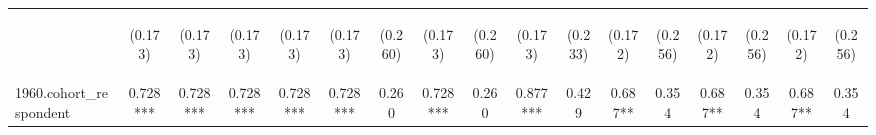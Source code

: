 \begin{center}
\begin{tabular}{lcccccccccccccccc}
\vspace{4pt} & \begin{footnotesize}(0.173)\end{footnotesize} & \begin{footnotesize}(0.173)\end{footnotesize} & \begin{footnotesize}(0.173)\end{footnotesize} & \begin{footnotesize}(0.173)\end{footnotesize} & \begin{footnotesize}(0.173)\end{footnotesize} & \begin{footnotesize}(0.260)\end{footnotesize} & \begin{footnotesize}(0.173)\end{footnotesize} & \begin{footnotesize}(0.260)\end{footnotesize} & \begin{footnotesize}(0.173)\end{footnotesize} & \begin{footnotesize}(0.233)\end{footnotesize} & \begin{footnotesize}(0.172)\end{footnotesize} & \begin{footnotesize}(0.256)\end{footnotesize} & \begin{footnotesize}(0.172)\end{footnotesize} & \begin{footnotesize}(0.256)\end{footnotesize} & \begin{footnotesize}(0.172)\end{footnotesize} & \begin{footnotesize}(0.256)\end{footnotesize} \\
1960.cohort\_respondent & 0.728*** & 0.728*** & 0.728*** & 0.728*** & 0.728*** & 0.260 & 0.728*** & 0.260 & 0.877*** & 0.429 & 0.687** & 0.354 & 0.687** & 0.354 & 0.687** & 0.354 \\

\end{tabular}
\end{center}
